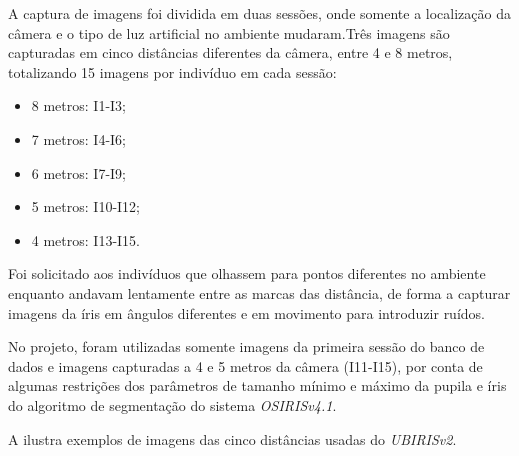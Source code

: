 \par A captura de imagens foi dividida em duas sessões, onde somente a localização da câmera e o tipo de luz artificial no ambiente mudaram.Três imagens são capturadas em cinco distâncias diferentes da câmera, entre 4 e 8 metros, totalizando 15 imagens por indivíduo em cada sessão: 

\begin{itemize}
    \item 8 metros: I1-I3;
    \item 7 metros: I4-I6;
    \item 6 metros: I7-I9;
    \item 5 metros: I10-I12;
    \item 4 metros: I13-I15.
\end{itemize}

\par Foi solicitado aos indivíduos que olhassem para pontos diferentes no ambiente enquanto andavam lentamente entre as marcas das distância, de forma a capturar imagens da íris em ângulos diferentes e em movimento para introduzir ruídos.

\par No projeto, foram utilizadas somente imagens da primeira sessão do banco de dados e imagens capturadas a 4 e 5 metros da câmera (I11-I15), por conta de algumas restrições dos parâmetros de tamanho mínimo e máximo da pupila e íris do algoritmo de segmentação do sistema \textit{OSIRISv4.1}.

\par A  ilustra exemplos de imagens das cinco distâncias usadas do \textit{UBIRISv2}.

